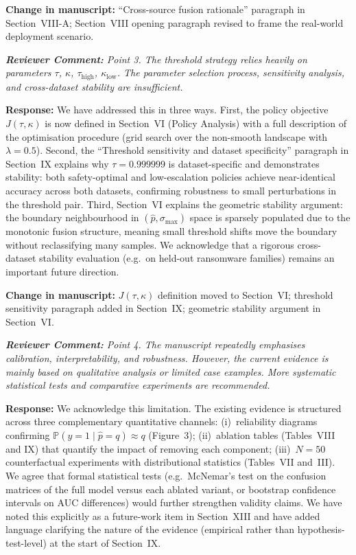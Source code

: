 \documentclass[11pt,a4paper]{article}
\newcommand{\RC}[1]{\begin{reviewbox}\textit{\textbf{Reviewer Comment:} #1}\end{reviewbox}}
\newcommand{\RS}[1]{\noindent\textcolor{responsegreen}{\textbf{Response:}} #1\par\medskip}
\newcommand{\CH}[1]{\noindent\textcolor{changebrown}{\textbf{Change in manuscript:}} #1\par\bigskip}
\begin{document}
\CH{``Cross-source fusion rationale'' paragraph in Section~VIII-A; Section~VIII
opening paragraph revised to frame the real-world deployment scenario.}

\RC{Point 3. The threshold strategy relies heavily on parameters $\tau$, $\kappa$,
$\tau_{\text{high}}$, $\kappa_{\text{low}}$. The parameter selection process,
sensitivity analysis, and cross-dataset stability are insufficient.}

\RS{We have addressed this in three ways. First, the policy objective
$J(\tau,\kappa)$ is now defined in Section~VI (Policy Analysis) with a full
description of the optimisation procedure (grid search over the non-smooth landscape
with $\lambda = 0.5$). Second, the ``Threshold sensitivity and dataset specificity''
paragraph in Section~IX explains why $\tau=0.999999$ is dataset-specific and
demonstrates stability: both safety-optimal and low-escalation policies achieve
near-identical accuracy across both datasets, confirming robustness to small
perturbations in the threshold pair. Third, Section~VI explains the geometric
stability argument: the boundary neighbourhood in $(\hat{p},\sigma_{\max})$ space
is sparsely populated due to the monotonic fusion structure, meaning small threshold
shifts move the boundary without reclassifying many samples. We acknowledge that
a rigorous cross-dataset stability evaluation (e.g.\ on held-out ransomware families)
remains an important future direction.}

\CH{$J(\tau,\kappa)$ definition moved to Section~VI; threshold sensitivity paragraph
added in Section~IX; geometric stability argument in Section~VI.}

\RC{Point 4. The manuscript repeatedly emphasises calibration, interpretability, and
robustness. However, the current evidence is mainly based on qualitative analysis or
limited case examples. More systematic statistical tests and comparative experiments
are recommended.}

\RS{We acknowledge this limitation. The existing evidence is structured across
three complementary quantitative channels: (i)~reliability diagrams confirming
$\mathbb{P}(y=1 \mid \hat{p}=q) \approx q$ (Figure~3); (ii)~ablation tables
(Tables~VIII and IX) that quantify the impact of removing each component;
(iii)~$N=50$ counterfactual experiments with distributional statistics
(Tables~VII and~III). We agree that formal statistical tests (e.g.\ McNemar's
test on the confusion matrices of the full model versus each ablated variant,
or bootstrap confidence intervals on AUC differences) would further strengthen
validity claims. We have noted this explicitly as a future-work item in
Section~XIII and have added language clarifying the nature of the evidence
(empirical rather than hypothesis-test-level) at the start of Section~IX.}
\end{document}
